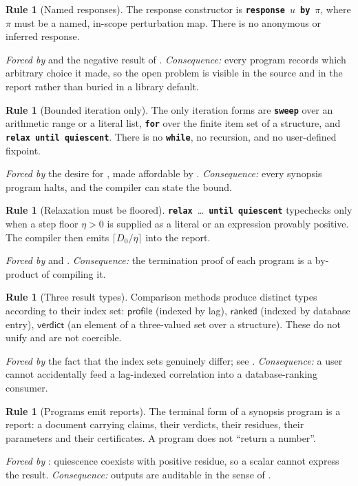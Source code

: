 \documentclass[11pt,twocolumn,a4paper]{article}
\theoremstyle{plain}
\theoremstyle{definition}
\newtheorem{drule}[theorem]{Rule}
\theoremstyle{remark}
\newcommand{\dem}{D}
\newcommand{\resp}{\pi}
\newcommand{\typ}[1]{\ensuremath{\mathsf{#1}}}
\newcommand{\kw}[1]{\texttt{\textbf{#1}}}
\begin{document}
\begin{drule}[Named responses]
\label{rule:namedresponse}
The response constructor is \kw{response}~$u$~\kw{by}~$\resp$, where
$\resp$ must be a named, in-scope perturbation map. There is no anonymous
or inferred response.
\end{drule}
\noindent\emph{Forced by}  and the negative result of
. \emph{Consequence:} every program records which
arbitrary choice it made, so the open problem is visible in the source
and in the report rather than buried in a library default.

\begin{drule}[Bounded iteration only]
\label{rule:bounded}
The only iteration forms are \kw{sweep} over an arithmetic range or a
literal list, \kw{for} over the finite item set of a structure, and
\kw{relax until quiescent}. There is no \kw{while}, no recursion, and no
user-defined fixpoint.
\end{drule}
\noindent\emph{Forced by} the desire for , made
affordable by . \emph{Consequence:} every synopsis
program halts, and the compiler can state the bound.

\begin{drule}[Relaxation must be floored]
\label{rule:floored}
\kw{relax}~\ldots~\kw{until quiescent} typechecks only when a step floor
$\eta>0$ is supplied as a literal or an expression provably positive.
The compiler then emits $\lceil \dem_0/\eta\rceil$ into the report.
\end{drule}
\noindent\emph{Forced by}  and .
\emph{Consequence:} the termination proof of each program is a
by-product of compiling it.

\begin{drule}[Three result types]
\label{rule:three}
Comparison methods produce distinct types according to their index set:
\typ{profile} (indexed by lag), \typ{ranked} (indexed by database
entry), \typ{verdict} (an element of a three-valued set over a
structure). These do not unify and are not coercible.
\end{drule}
\noindent\emph{Forced by} the fact that the index sets genuinely differ;
see . \emph{Consequence:} a user cannot
accidentally feed a lag-indexed correlation into a database-ranking
consumer.

\begin{drule}[Programs emit reports]
\label{rule:report}
The terminal form of a synopsis program is a report: a document carrying
claims, their verdicts, their residues, their parameters and their
certificates. A program does not ``return a number''.
\end{drule}
\noindent\emph{Forced by} : quiescence coexists with
positive residue, so a scalar cannot express the result.
\emph{Consequence:} outputs are auditable in the sense of
\cite{sandve2013ten,wilkinson2016fair,moreau2011provenance}.
\end{document}
